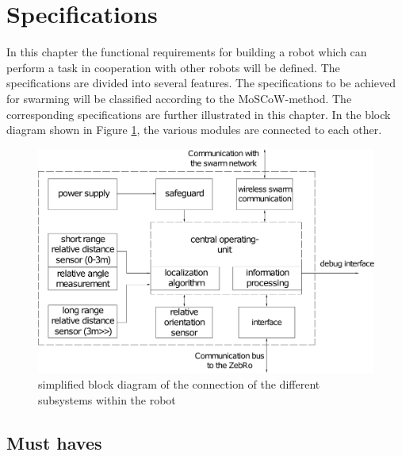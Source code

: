 \documentclass[10pt,a4paper]{article}
\begin{document}
\newpage

\section{Specifications}
In this chapter the functional requirements for building a robot which can perform a task in cooperation with other robots will be defined. The specifications are divided into several features. The specifications to be achieved for swarming will be classified according to the MoSCoW-method. The corresponding specifications are further illustrated in this chapter. In the block diagram shown in Figure  \ref{fig:blockschematic}, the various modules are connected to each other.


\begin{figure}[h]
    \centering
    \includegraphics[width=1\textwidth]{newblock.pdf}
    \caption{simplified block diagram of the connection of the different subsystems within the robot }
    \label{fig:blockschematic}
\end{figure}



\subsection{Must haves}
\end{document}
